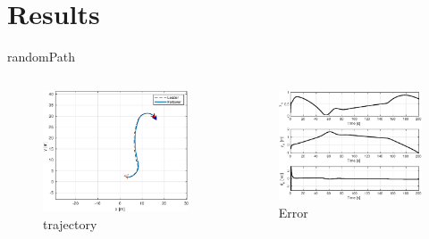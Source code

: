\documentclass{beamer}
\begin{document}
\section{Results}
\begin{frame}{randomPath}
\begin{columns}
\begin{column}{0.5\textwidth}
\begin{figure}
\includegraphics[scale=0.35]{figs/matlab/gradientDescent/randomPath/trajectoryRandomPath.eps}
\caption{trajectory}
\end{figure}
\end{column}

\begin{column}{0.5\textwidth}
\begin{center}

\begin{figure}
\includegraphics[scale=0.45]{figs/matlab/gradientDescent/randomPath/stateErrorRandomPath.eps}
\caption{Error}
\end{figure}
\end{center}

\end{column}

\end{columns}
\end{frame}
\end{document}
